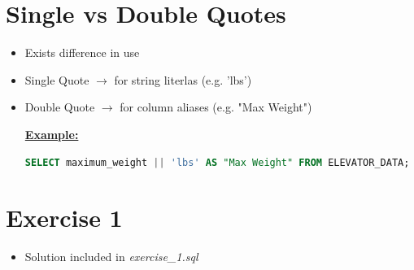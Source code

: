 \documentclass[12pt]{article}
\begin{document}
\bigskip

\section{Single vs Double Quotes}

\bigskip

\begin{itemize}
    \item Exists difference in use
    \item Single Quote $\to$ for string literlas (e.g. 'lbs')
    \item Double Quote $\to$ for column aliases (e.g. "Max Weight")

    \bigskip

    \underline{\textbf{Example:}}

    \bigskip

    \begin{lstlisting}[language=SQL]
    SELECT maximum_weight || 'lbs' AS "Max Weight" FROM ELEVATOR_DATA;
    \end{lstlisting}

\end{itemize}

\bigskip

\section{Exercise 1}

\bigskip

\begin{itemize}
    \item Solution included in \textit{exercise\_1.sql}
\end{itemize}
\end{document}
